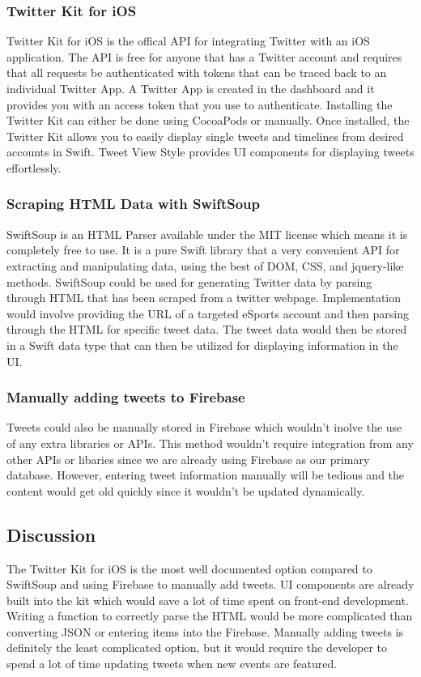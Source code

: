 \documentclass[onecolumn, draftclsnofoot,10pt, compsoc]{IEEEtran}
\begin{document}
\subsubsection{Twitter Kit for iOS\cite{twitter}}
Twitter Kit for iOS is the offical API for integrating Twitter with an iOS application.
The API is free for anyone that has a Twitter account and requires that all requests be authenticated with tokens that can be traced back to an individual Twitter App.
A Twitter App is created in the dashboard and it provides you with an access token that you use to authenticate.
Installing the Twitter Kit can either be done using CocoaPods or manually. 
Once installed, the Twitter Kit allows you to easily display single tweets and timelines from desired accounts in Swift.
Tweet View Style provides UI components for displaying tweets effortlessly. 
\subsubsection{Scraping HTML Data with SwiftSoup\cite{ssoup}}
SwiftSoup is an HTML Parser available under the MIT license which means it is completely free to use. 
It is a pure Swift library that a very convenient API for extracting and manipulating data, using the best of DOM, CSS, and jquery-like methods.
SwiftSoup could be used for generating Twitter data by parsing through HTML that has been scraped from a twitter webpage. 
Implementation would involve providing the URL of a targeted eSports account and then parsing through the HTML for specific tweet data. 
The tweet data would then be stored in a Swift data type that can then be utilized for displaying information in the UI. 
\subsubsection{Manually adding tweets to Firebase\cite{fb}}
Tweets could also be manually stored in Firebase which wouldn't inolve the use of any extra libraries or APIs.
This method wouldn't require integration from any other APIs or libaries since we are already using Firebase as our primary database. 
However, entering tweet information manually will be tedious and the content would get old quickly since it wouldn't be updated dynamically.
\subsection{Discussion}
The Twitter Kit for iOS is the most well documented option compared to SwiftSoup and using Firebase to manually add tweets.
UI components are already built into the kit which would save a lot of time spent on front-end development. 
Writing a function to correctly parse the HTML would be more complicated than converting JSON or entering items into the Firebase. 
Manually adding tweets is definitely the least complicated option, but it would require the developer to spend a lot of time updating tweets when new events are featured. 
\end{document}
